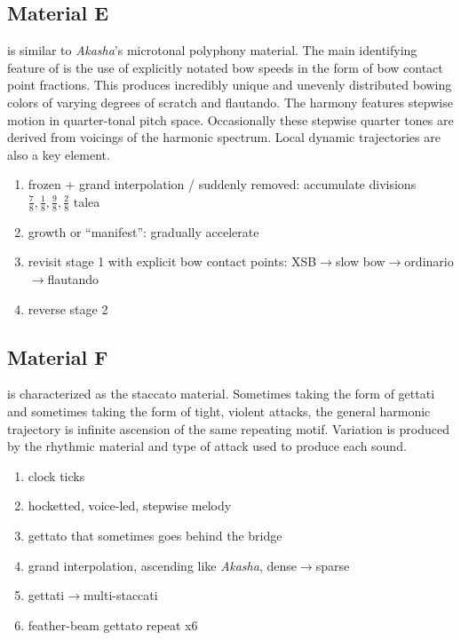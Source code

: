 \subsection{Material E}

 is similar to \textit{Akasha}'s microtonal polyphony material. The main identifying feature of  is the use of explicitly notated bow speeds in the form of bow contact point fractions. This produces incredibly unique and unevenly distributed bowing colors of varying degrees of scratch and flautando. The harmony features stepwise motion in quarter-tonal pitch space. Occasionally these stepwise quarter tones are derived from voicings of the harmonic spectrum. Local dynamic trajectories are also a key element.

\begin{enumerate}
\item frozen + grand interpolation / suddenly removed: accumulate divisions $\frac{7}{8}, \frac{1}{8}, \frac{9}{8}, \frac{2}{8}$ talea
\item growth or ``manifest'': gradually accelerate
\item revisit stage 1 with explicit bow contact points: \ac{XSB}$\rightarrow$slow bow$\rightarrow$ordinario$\rightarrow$flautando
\item reverse stage 2
\end{enumerate}

\subsection{Material F}

 is characterized as the staccato material. Sometimes taking the form of gettati and sometimes taking the form of tight, violent attacks, the general harmonic trajectory is infinite ascension of the same repeating motif. Variation is produced by the rhythmic material and type of attack used to produce each sound. 

\begin{enumerate}
\item clock ticks
\item hocketted, voice-led, stepwise melody
\item gettato that sometimes goes behind the bridge
\item grand interpolation, ascending like \textit{Akasha}, dense$\rightarrow$sparse
\item gettati$\rightarrow$multi-staccati
\item feather-beam gettato repeat x6
\end{enumerate}

